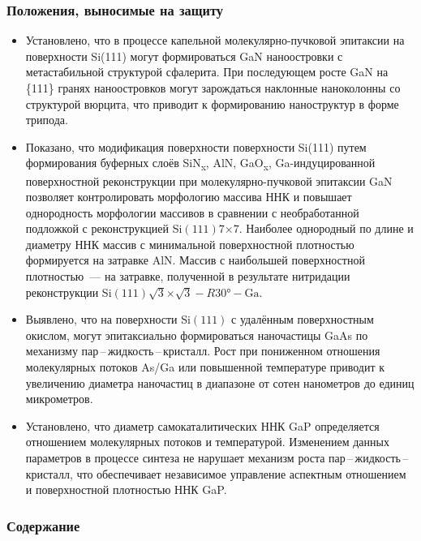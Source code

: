 \begin{frame}
    \setcounter{framenumber}{1}
    \maketitle
\end{frame}

\begin{frame}
    \frametitle{Положения, выносимые на защиту}
    \begin{itemize}
\item Установлено, что в процессе капельной молекулярно-пучковой эпитаксии на
поверхности Si(111) могут формироваться GaN наноостровки с метастабильной
структурой сфалерита. При последующем росте GaN
на \{111\} гранях наноостровков могут зарождаться наклонные наноколонны со
структурой вюрцита, что приводит к формированию наноструктур в форме
трипода.
\item Показано, что модификация поверхности поверхности Si(111) путем формирования буферных слоёв SiN\textsubscript{x}, AlN, GaO\textsubscript{x}, Ga-индуцированной поверхностной реконструкции при молекулярно-пучковой эпитаксии GaN позволяет контролировать морфологию массива ННК и повышает однородность морфологии массивов в сравнении с необработанной подложкой с реконструкцией Si\((111)7\)\(\times\)\(7\). Наиболее однородный по
длине и диаметру ННК массив с минимальной поверхностной плотностью
формируется на затравке AlN. Массив с наибольшей поверхностной плотностью~--- на затравке, полученной в результате нитридации реконструкции
Si\((111)\sqrt{3}\)\(\times\)\(\sqrt{3} - R30\si{\degree} - \text{Ga}\).
\item Выявлено, что на поверхности Si\((111)\) с
удалённым поверхностным окислом, могут эпитаксиально формироваться наночастицы GaAs по механизму пар\,--\,жидкость\,--\,кристалл. Рост при пониженном
отношения молекулярных потоков As/Ga или повышенной температуре приводит к
увеличению диаметра наночастиц в диапазоне от сотен нанометров до единиц
микрометров.
\item Установлено, что диаметр самокаталитических ННК GaP определяется
отношением молекулярных потоков и температурой. Изменением данных
параметров в процессе синтеза не нарушает механизм роста
пар\,--\,жидкость\,--\,кристалл, что обеспечивает независимое управление
аспектным отношением и поверхностной плотностью ННК GaP.
    \end{itemize}
\end{frame}

\begin{frame}
    \frametitle{Содержание}
    \tableofcontents
\end{frame}
